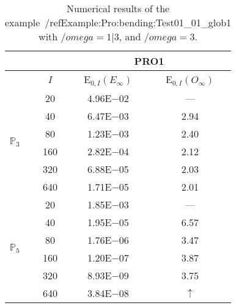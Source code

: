 \begin{table}[H]
\caption{Numerical results of the example~/ref{Example:Pro:bending:Test01_01_glob1} with $/omega=1|3$, and $/omega=3$.}
\setlength{\tabcolsep}{5pt}
\centering
\begin{tabular}{@{}l c c c@{}}
\toprule
 &  & \multicolumn{2}{c}{PRO1}\\
\midrule
 & $I$ & E$_{0,I}(E_{\infty})$ & E$_{0,I}(O_{\infty})$\\
\midrule
\multirow{6}{*}{$\mathbb{P}_{3}$}
 & 20 & 4.96E$-$02 & ---\\
 & 40 & 6.47E$-$03 & 2.94\\
 & 80 & 1.23E$-$03 & 2.40\\
 & 160 & 2.82E$-$04 & 2.12\\
 & 320 & 6.88E$-$05 & 2.03\\
 & 640 & 1.71E$-$05 & 2.01\\
\midrule
\multirow{6}{*}{$\mathbb{P}_{5}$}
 & 20 & 1.85E$-$03 & ---\\
 & 40 & 1.95E$-$05 & 6.57\\
 & 80 & 1.76E$-$06 & 3.47\\
 & 160 & 1.20E$-$07 & 3.87\\
 & 320 & 8.93E$-$09 & 3.75\\
 & 640 & 3.84E$-$08 & $\uparrow$\\
\bottomrule
\end{tabular}
\label{Table:PRO:test_01_01_test33_pro1}
\end{table}
